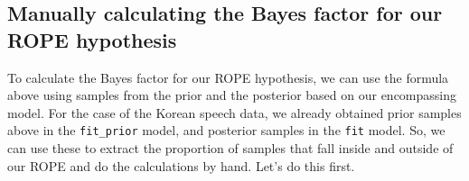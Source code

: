 \documentclass[
  doc,
  floatsintext,
  longtable,
  nolmodern,
  notxfonts,
  notimes,
  colorlinks=true,linkcolor=blue,citecolor=blue,urlcolor=blue]{apa7}
\begin{document}
\begin{figure}[!tbp]

\caption{\label{fig-savage-dickey_TR}}


\end{figure}%

\subsection{Manually calculating the Bayes factor for our ROPE
hypothesis}\label{manually-calculating-the-bayes-factor-for-our-rope-hypothesis}

To calculate the Bayes factor for our ROPE hypothesis, we can use the
formula above using samples from the prior and the posterior based on
our encompassing model. For the case of the Korean speech data, we
already obtained prior samples above in the \texttt{fit\_prior} model,
and posterior samples in the \texttt{fit} model. So, we can use these to
extract the proportion of samples that fall inside and outside of our
ROPE and do the calculations by hand. Let's do this first.
\end{document}
